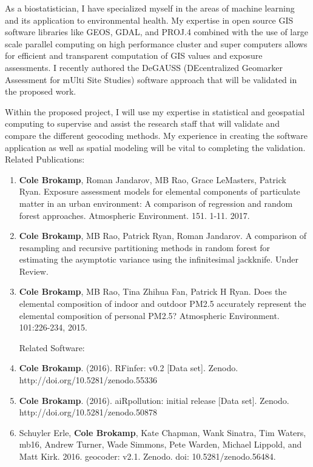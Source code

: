 \documentclass{nihbiosketch}
\begin{document}
\begin{statement}
As a biostatistician, I have specialized myself in the areas of machine learning and its application to environmental health. My expertise in open source GIS software libraries like GEOS, GDAL, and PROJ.4 combined with the use of large scale parallel computing on high performance cluster and super computers allows for efficient and transparent computation of GIS values and exposure assessments. I recently authored the DeGAUSS (DEcentralized Geomarker Assessment for mUlti Site Studies) software approach that will be validated in the proposed work.

Within the proposed project, I will use my expertise in statistical and geospatial computing to supervise and assist the research staff that will validate and compare the different geocoding methods. My experience in creating the software application as well as spatial modeling will be vital to completing the validation. \\

\noindent Related Publications:

\begin{enumerate}

\item \textbf{Cole Brokamp}, Roman Jandarov, MB Rao, Grace LeMasters, Patrick Ryan. Exposure assessment models for elemental components of particulate matter in an urban environment: A comparison of regression and random forest approaches. Atmospheric Environment. 151. 1-11. 2017.

\item \textbf{Cole Brokamp}, MB Rao, Patrick Ryan, Roman Jandarov. A comparison of resampling and recursive partitioning methods in random forest for estimating the asymptotic variance using the infinitesimal jackknife. Under Review.

\item \textbf{Cole Brokamp}, MB Rao, Tina Zhihua Fan, Patrick H Ryan. Does the elemental composition of indoor and outdoor PM2.5 accurately represent the elemental composition of personal PM2.5? Atmospheric Environment. 101:226-234, 2015.

\noindent Related Software:

\item \textbf{Cole Brokamp}. (2016). RFinfer: v0.2 [Data set]. Zenodo. http://doi.org/10.5281/zenodo.55336

\item \textbf{Cole Brokamp}. (2016). aiRpollution: initial release [Data set]. Zenodo. http://doi.org/10.5281/zenodo.50878

\item Schuyler Erle, \textbf{Cole Brokamp}, Kate Chapman, Wank Sinatra, Tim Waters, mb16, Andrew Turner, Wade Simmons, Pete Warden, Michael Lippold, and Matt Kirk. 2016. geocoder: v2.1. Zenodo. doi: 10.5281/zenodo.56484.

\end{enumerate}

\end{statement}
\end{document}

